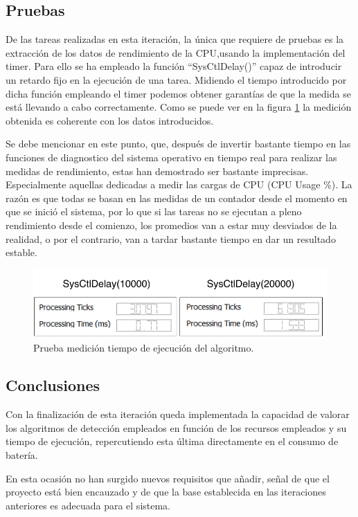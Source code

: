     \subsection{Pruebas}
        
        De las tareas realizadas en esta iteración, la única que requiere de pruebas es la extracción de los datos de rendimiento de la CPU,usando la implementación del timer. Para ello se ha empleado la función ``SysCtlDelay()'' capaz de introducir un retardo fijo en la ejecución de una tarea. Midiendo el tiempo introducido por dicha función empleando el timer podemos obtener garantías de que la medida se está llevando a cabo correctamente. Como se puede ver en la figura \ref{fig:performanceTest} la medición obtenida es coherente con los datos introducidos.
        
        Se debe mencionar en este punto, que, después de invertir bastante tiempo en las funciones de diagnostico del sistema operativo en tiempo real para realizar las medidas de rendimiento, estas han demostrado ser bastante imprecisas. Especialmente aquellas dedicadas a medir las cargas de CPU (CPU Usage \%). La razón es que todas se basan en las medidas de un contador desde el momento en que se inició el sistema, por lo que si las tareas no se ejecutan a pleno rendimiento desde el comienzo, los promedios van a estar muy desviados de la realidad, o por el contrario, van a tardar bastante tiempo en dar un resultado estable.
        
        \begin{figure}[H]
                \centering
                        \includegraphics[width = 0.9 \linewidth]{figuras/PerformanceTest.pdf}
                \caption{Prueba medición tiempo de ejecución del algoritmo.}
                \label{fig:performanceTest}
        \end{figure}

    \subsection{Conclusiones}
    
    Con la finalización de esta iteración queda implementada la capacidad de valorar los algoritmos de detección empleados en función de los recursos empleados y su tiempo de ejecución, repercutiendo esta última directamente en el consumo de batería.
    
    En esta ocasión no han surgido nuevos requisitos que añadir, señal de que el proyecto está bien encauzado y de que la base establecida en las iteraciones anteriores es adecuada para el sistema.